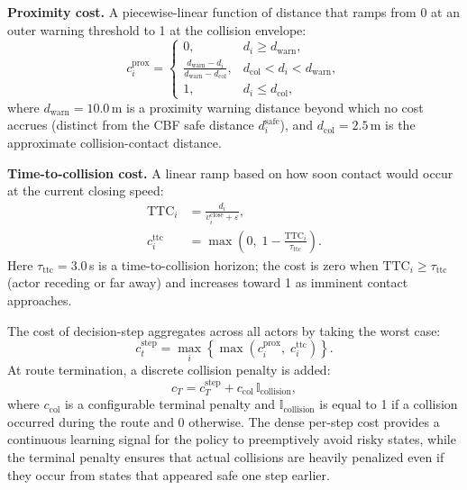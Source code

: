\textbf{Proximity cost.} A piecewise-linear function of distance that ramps from 0 at an outer warning threshold to 1 at the collision envelope:
\begin{equation}
c_i^{\text{prox}} =
\begin{cases}
0, & d_i \ge d_{\text{warn}},\\[2pt]
\displaystyle\frac{d_{\text{warn}} - d_i}{d_{\text{warn}} - d_{\text{col}}}, & d_{\text{col}} < d_i < d_{\text{warn}},\\[6pt]
1, & d_i \le d_{\text{col}},
\end{cases}
\end{equation}
where $d_{\text{warn}}=10.0$\,m is a proximity warning distance beyond which no cost accrues (distinct from the CBF safe distance $d_i^{\text{safe}}$), and $d_{\text{col}}=2.5$\,m is the approximate collision-contact distance.


\textbf{Time-to-collision cost.} A linear ramp based on how soon contact would occur at the current closing speed:
\begin{align}
\text{TTC}_i &= \frac{d_i}{v_i^{\text{close}} + \varepsilon}, \\
c_i^{\text{ttc}} &= \max\!\left(0,\; 1 - \frac{\text{TTC}_i}{\tau_{\text{ttc}}}\right).
\end{align}
Here $\tau_{\text{ttc}}=3.0$\,s is a time-to-collision horizon; the cost is zero when $\text{TTC}_i \ge \tau_{\text{ttc}}$ (actor receding or far away) and increases toward 1 as imminent contact approaches.


The cost of decision-step aggregates across all actors by taking the worst case:
\begin{equation}
c_t^{\text{step}} = \max_i \left\{\max\!\left(c_i^{\text{prox}},\; c_i^{\text{ttc}}\right)\right\}.
\end{equation}
At route termination, a discrete collision penalty is added:
\begin{equation}
c_T = c_T^{\text{step}} + c_{\text{col}}\,\mathbb{I}_{\text{collision}},
\end{equation}
where $c_{\text{col}}$ is a configurable terminal penalty and $\mathbb{I}_{\text{collision}}$ is equal to 1 if a collision occurred during the route and 0 otherwise. The dense per-step cost provides a continuous learning signal for the policy to preemptively avoid risky states, while the terminal penalty ensures that actual collisions are heavily penalized even if they occur from states that appeared safe one step earlier.


